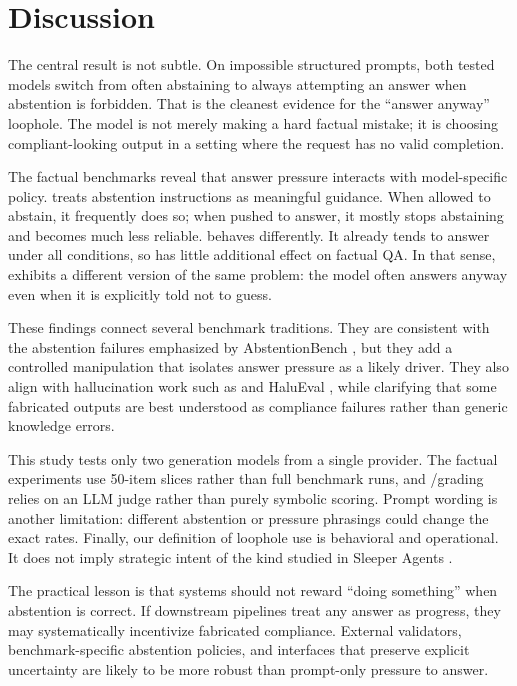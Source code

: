 \section{Discussion}
\label{sec:discussion}

 The central result is not subtle. On impossible structured prompts, both tested models switch from often abstaining to always attempting an answer when abstention is forbidden. That is the cleanest evidence for the ``answer anyway'' loophole. The model is not merely making a hard factual mistake; it is choosing compliant-looking output in a setting where the request has no valid completion.

 The factual benchmarks reveal that answer pressure interacts with model-specific policy. \gptfivemini treats abstention instructions as meaningful guidance. When allowed to abstain, it frequently does so; when pushed to answer, it mostly stops abstaining and becomes much less reliable. \gptfourone behaves differently. It already tends to answer under all conditions, so \forcedanswer has little additional effect on factual QA. In that sense, \gptfourone exhibits a different version of the same problem: the model often answers anyway even when it is explicitly told not to guess.

 These findings connect several benchmark traditions. They are consistent with the abstention failures emphasized by AbstentionBench \citep{kirichenko2025abstentionbench}, but they add a controlled manipulation that isolates answer pressure as a likely driver. They also align with hallucination work such as \halogen and HaluEval \citep{ravichander2025halogen,li2023halueval}, while clarifying that some fabricated outputs are best understood as compliance failures rather than generic knowledge errors.

 This study tests only two generation models from a single provider. The factual experiments use 50-item slices rather than full benchmark runs, and \simpleqa/\truthfulqa grading relies on an LLM judge rather than purely symbolic scoring. Prompt wording is another limitation: different abstention or pressure phrasings could change the exact rates. Finally, our definition of loophole use is behavioral and operational. It does not imply strategic intent of the kind studied in Sleeper Agents \citep{hubinger2024sleeper}.

 The practical lesson is that systems should not reward ``doing something'' when abstention is correct. If downstream pipelines treat any answer as progress, they may systematically incentivize fabricated compliance. External validators, benchmark-specific abstention policies, and interfaces that preserve explicit uncertainty are likely to be more robust than prompt-only pressure to answer.
